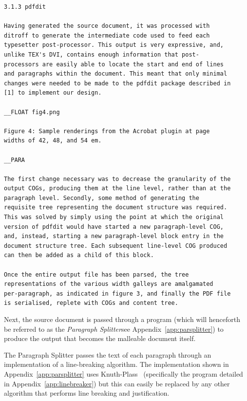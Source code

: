 \begin{lstlisting}[label=lst:sourcedoc,captionpos=b,float,caption={[An excerpt from a sample source document]An excerpt from a sample source document, itself an excerpt from \cite{Pinkney2011}. The document is parsed from top to bottom. Paragraphs are separated by blank lines. Floats are specified by lines that begin \texttt{\_\_FLOAT} and contain a reference to an image. Subsequent lines, until the next \texttt{\_\_FLOAT} or \texttt{\_\_PARA} marker, are interpreted as the float caption.}]
3.1.3 pdfdit

Having generated the source document, it was processed with
ditroff to generate the intermediate code used to feed each
typesetter post-processor. This output is very expressive, and,
unlike TEX's DVI, contains enough information that post-
processors are easily able to locate the start and end of lines
and paragraphs within the document. This meant that only minimal
changes were needed to be made to the pdfdit package described in
[1] to implement our design.

__FLOAT fig4.png

Figure 4: Sample renderings from the Acrobat plugin at page
widths of 42, 48, and 54 em.

__PARA

The first change necessary was to decrease the granularity of the
output COGs, producing them at the line level, rather than at the
paragraph level. Secondly, some method of generating the
requisite tree representing the document structure was required.
This was solved by simply using the point at which the original
version of pdfdit would have started a new paragraph-level COG,
and, instead, starting a new paragraph-level block entry in the
document structure tree. Each subsequent line-level COG produced
can then be added as a child of this block.

Once the entire output file has been parsed, the tree
representations of the various width galleys are amalgamated
per-paragraph, as indicated in figure 3, and finally the PDF file
is serialised, replete with COGs and content tree.

\end{lstlisting}


Next, the source document is passed through a program (which will henceforth be referred to as the \emph{Paragraph Splitter}\ed see Appendix~\ref{app:parsplitter}) to produce the output that becomes the malleable document itself.

The Paragraph Splitter passes the text of each paragraph through an implementation of a line-breaking algorithm. The implementation shown in Appendix~\ref{app:parsplitter} uses Knuth-Plass~\cite{Knuth1981} (specifically the program detailed in Appendix~\ref{app:linebreaker}) but this can easily be replaced by any other algorithm that performs line breaking and justification.

